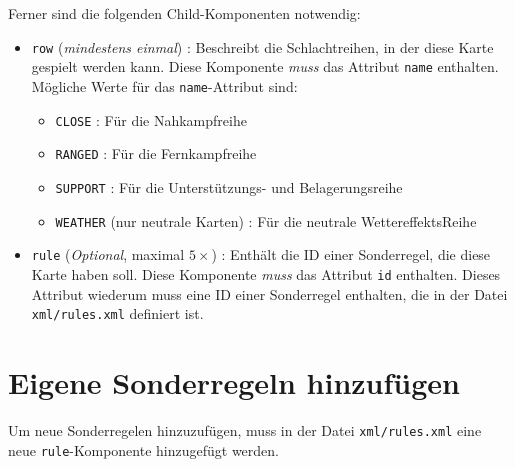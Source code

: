 \documentclass[a4paper,11pt]{report}
\begin{document}
Ferner sind die folgenden Child-Komponenten notwendig:
\begin{itemize}
	\item \verb+row+ (\emph{mindestens einmal}) : Beschreibt die Schlachtreihen, in der diese Karte gespielt werden kann. Diese Komponente \emph{muss} das Attribut \verb+name+ enthalten. Mögliche Werte für das \verb+name+-Attribut sind:
	\begin{itemize}
		\item \verb+CLOSE+ : Für die Nahkampfreihe
		\item \verb+RANGED+ : Für die Fernkampfreihe
		\item \verb+SUPPORT+ : Für die Unterstützungs- und Belagerungsreihe
		\item \verb+WEATHER+ (nur neutrale Karten) : Für die neutrale WettereffektsReihe
	\end{itemize}
	\item \verb+rule+ (\emph{Optional}, maximal $5\times$) : Enthält die ID einer Sonderregel, die diese Karte haben soll. Diese Komponente \emph{muss} das Attribut \verb+id+ enthalten. Dieses Attribut wiederum muss eine ID einer Sonderregel enthalten, die in der Datei \verb+xml/rules.xml+ definiert ist.
\end{itemize}

\section{Eigene Sonderregeln hinzufügen}
Um neue Sonderregelen hinzuzufügen, muss in der Datei \verb+xml/rules.xml+ eine neue \verb+rule+-Komponente hinzugefügt werden.
\end{document}
